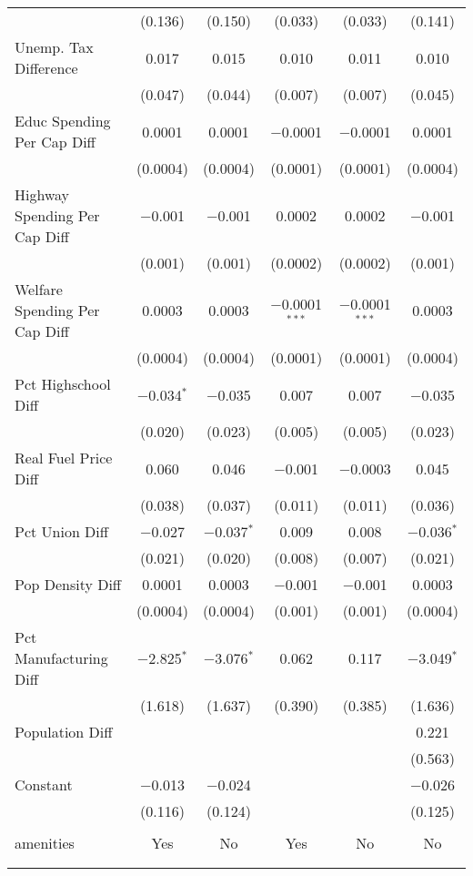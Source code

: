 \begin{table}[!htbp]
\begin{tabular}{@{\extracolsep{5pt}}lccccc}
  & (0.136) & (0.150) & (0.033) & (0.033) & (0.141) \\ 
  Unemp. Tax Difference & 0.017 & 0.015 & 0.010 & 0.011 & 0.010 \\ 
  & (0.047) & (0.044) & (0.007) & (0.007) & (0.045) \\ 
  Educ Spending Per Cap Diff & 0.0001 & 0.0001 & $-$0.0001 & $-$0.0001 & 0.0001 \\ 
  & (0.0004) & (0.0004) & (0.0001) & (0.0001) & (0.0004) \\ 
  Highway Spending Per Cap Diff & $-$0.001 & $-$0.001 & 0.0002 & 0.0002 & $-$0.001 \\ 
  & (0.001) & (0.001) & (0.0002) & (0.0002) & (0.001) \\ 
  Welfare Spending Per Cap Diff & 0.0003 & 0.0003 & $-$0.0001$^{***}$ & $-$0.0001$^{***}$ & 0.0003 \\ 
  & (0.0004) & (0.0004) & (0.0001) & (0.0001) & (0.0004) \\ 
  Pct Highschool Diff & $-$0.034$^{*}$ & $-$0.035 & 0.007 & 0.007 & $-$0.035 \\ 
  & (0.020) & (0.023) & (0.005) & (0.005) & (0.023) \\ 
  Real Fuel Price Diff & 0.060 & 0.046 & $-$0.001 & $-$0.0003 & 0.045 \\ 
  & (0.038) & (0.037) & (0.011) & (0.011) & (0.036) \\ 
  Pct Union Diff & $-$0.027 & $-$0.037$^{*}$ & 0.009 & 0.008 & $-$0.036$^{*}$ \\ 
  & (0.021) & (0.020) & (0.008) & (0.007) & (0.021) \\ 
  Pop Density Diff & 0.0001 & 0.0003 & $-$0.001 & $-$0.001 & 0.0003 \\ 
  & (0.0004) & (0.0004) & (0.001) & (0.001) & (0.0004) \\ 
  Pct Manufacturing Diff & $-$2.825$^{*}$ & $-$3.076$^{*}$ & 0.062 & 0.117 & $-$3.049$^{*}$ \\ 
  & (1.618) & (1.637) & (0.390) & (0.385) & (1.636) \\ 
  Population Diff &  &  &  &  & 0.221 \\ 
  &  &  &  &  & (0.563) \\ 
  Constant & $-$0.013 & $-$0.024 &  &  & $-$0.026 \\ 
  & (0.116) & (0.124) &  &  & (0.125) \\ 
 \hline \\[-1.8ex] 
amenities & Yes & No & Yes & No & No \\ 
\hline \\[-1.8ex] 
\hline 
\hline \\[-1.8ex] 
\end{tabular} 
\end{table} 
